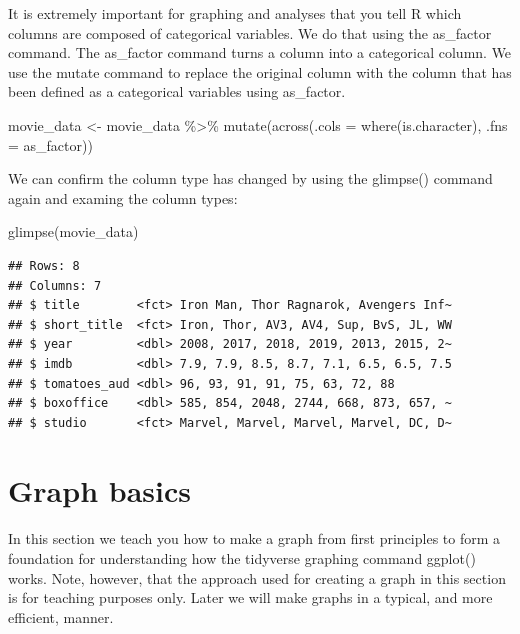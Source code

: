 \documentclass[
]{krantz}
\makeatletter
\newenvironment{Shaded}{\begin{snugshade}}{\end{snugshade}}
\newcommand{\AttributeTok}[1]{\textcolor[rgb]{0.61,0.61,0.61}{#1}}
\newcommand{\FunctionTok}[1]{\textcolor[rgb]{0,0,0}{#1}}
\newcommand{\NormalTok}[1]{#1}
\newcommand{\OtherTok}[1]{\textcolor[rgb]{0.37,0.37,0.37}{#1}}
\newcommand{\SpecialCharTok}[1]{\textcolor[rgb]{0,0,0}{#1}}
\newenvironment{kframe}{%
\medskip{}
\setlength{\fboxsep}{.8em}
 \def\at@end@of@kframe{}%
 \ifinner\ifhmode%
  \def\at@end@of@kframe{\end{minipage}}%
  \begin{minipage}{\columnwidth}%
 \fi\fi%
 \def\FrameCommand##1{\hskip\@totalleftmargin \hskip-\fboxsep
 \colorbox{shadecolor}{##1}\hskip-\fboxsep
     \hskip-\linewidth \hskip-\@totalleftmargin \hskip\columnwidth}%
 \MakeFramed {\advance\hsize-\width
   \@totalleftmargin\z@ \linewidth\hsize
   \@setminipage}}%
 {\par\unskip\endMakeFramed%
 \at@end@of@kframe}
\renewenvironment{Shaded}{\begin{kframe}}{\end{kframe}}
\makeatother
\begin{document}
It is extremely important for graphing and analyses that you tell R which columns are composed of categorical variables. We do that using the as\_factor command. The as\_factor command turns a column into a categorical column. We use the mutate command to replace the original column with the column that has been defined as a categorical variables using as\_factor.

\begin{Shaded}
\begin{Highlighting}[]
\NormalTok{movie\_data }\OtherTok{\textless{}{-}}\NormalTok{ movie\_data }\SpecialCharTok{\%\textgreater{}\%} 
  \FunctionTok{mutate}\NormalTok{(}\FunctionTok{across}\NormalTok{(}\AttributeTok{.cols =} \FunctionTok{where}\NormalTok{(is.character), }
                \AttributeTok{.fns =}\NormalTok{ as\_factor))}
\end{Highlighting}
\end{Shaded}

We can confirm the column type has changed by using the glimpse() command again and examing the column types:

\begin{Shaded}
\begin{Highlighting}[]
\FunctionTok{glimpse}\NormalTok{(movie\_data)}
\end{Highlighting}
\end{Shaded}

\begin{verbatim}
## Rows: 8
## Columns: 7
## $ title        <fct> Iron Man, Thor Ragnarok, Avengers Inf~
## $ short_title  <fct> Iron, Thor, AV3, AV4, Sup, BvS, JL, WW
## $ year         <dbl> 2008, 2017, 2018, 2019, 2013, 2015, 2~
## $ imdb         <dbl> 7.9, 7.9, 8.5, 8.7, 7.1, 6.5, 6.5, 7.5
## $ tomatoes_aud <dbl> 96, 93, 91, 91, 75, 63, 72, 88
## $ boxoffice    <dbl> 585, 854, 2048, 2744, 668, 873, 657, ~
## $ studio       <fct> Marvel, Marvel, Marvel, Marvel, DC, D~
\end{verbatim}

\hypertarget{graph-basics}{%
\section{Graph basics}\label{graph-basics}}

In this section we teach you how to make a graph from first principles to form a foundation for understanding how the tidyverse graphing command ggplot() works. Note, however, that the approach used for creating a graph in this section is for teaching purposes only. Later we will make graphs in a typical, and more efficient, manner.
\end{document}
